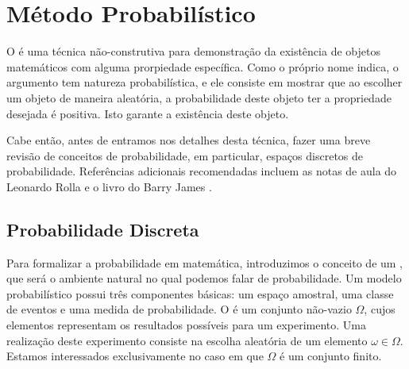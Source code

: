
\chapter{Método Probabilístico}
\label{chap:prob}


O  é uma técnica não-construtiva para demonstração da existência de objetos matemáticos com alguma prorpiedade específica. Como o próprio nome indica, o argumento tem natureza probabilística, e ele consiste em mostrar que ao escolher um objeto de maneira aleatória, a probabilidade deste objeto ter a propriedade desejada é positiva. Isto garante a existência deste objeto.

Cabe então, antes de entramos nos detalhes desta técnica, fazer uma breve revisão de conceitos de probabilidade, em particular, espaços discretos de probabilidade. Referências adicionais recomendadas incluem as notas de aula do Leonardo Rolla \cite{rolla} e o livro do Barry James \cite{barryjames}.


\section{Probabilidade Discreta}

Para formalizar a probabilidade em matemática, introduzimos o conceito de um , que será o ambiente natural no qual podemos falar de probabilidade.
Um modelo probabilístico possui três componentes básicas: um espaço amostral, uma classe de eventos e uma medida de probabilidade. O  é um conjunto não-vazio $\Omega$, cujos elementos representam os resultados possíveis para um experimento. Uma realização deste experimento consiste na escolha aleatória de um elemento $\omega \in \Omega$. Estamos interessados exclusivamente no caso em que $\Omega$ é um conjunto finito.

